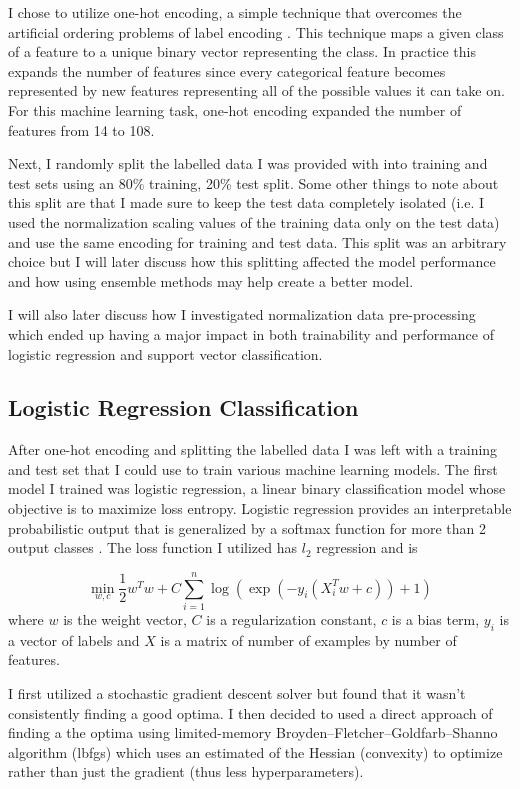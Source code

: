 \documentclass[11pt]{article}
\begin{document}
I chose to utilize one-hot encoding, a simple technique that overcomes the artificial ordering problems of label encoding \cite{hancock_survey_2020}. 
This technique maps a given class of a feature to a unique binary vector representing the class.
In practice this expands the number of features since every categorical feature becomes represented by new features representing all of the possible values it can take on. 
For this machine learning task, one-hot encoding expanded the number of features from 14 to 108.

Next, I randomly split the labelled data I was provided with into training and test sets using an 80\% training, 20\% test split.
Some other things to note about this split are that I made sure to keep the test data completely isolated (i.e. I used the normalization scaling values of the training data only on the test data) and use the same encoding for training and test data.
This split was an arbitrary choice but I will later discuss how this splitting affected the model performance and how using ensemble methods may help create a better model.

I will also later discuss how I investigated normalization data pre-processing which ended up having a major impact in both trainability and performance of logistic regression and support vector classification.

\subsection*{Logistic Regression Classification}
After one-hot encoding and splitting the labelled data I was left with a training and test set that I could use to train various machine learning models.
The first model I trained was logistic regression, a linear binary classification model whose objective is to maximize loss entropy. 
Logistic regression provides an interpretable probabilistic output that is generalized by a softmax function for more than 2 output classes \cite{noauthor_11_nodate}.
The loss function I utilized has $l_2$ regression and is 

\[
\min_{w, c} \frac{1}{2}w^T w + C \sum_{i=1}^n \log(\exp(- y_i (X_i^T w + c)) + 1) 
\]
where $w$ is the weight vector, $C$ is a regularization constant, $c$ is a bias term, $y_i$ is a vector of labels and $X$ is a matrix of number of examples by number of features.

I first utilized a stochastic gradient descent solver but found that it wasn't consistently finding a good optima. 
I then decided to used a direct approach of finding a the optima using limited-memory Broyden–Fletcher–Goldfarb–Shanno algorithm (lbfgs) which uses an estimated of the Hessian (convexity) to optimize rather than just the gradient (thus less hyperparameters).
\end{document}

